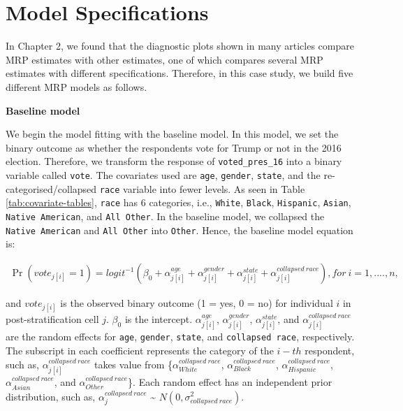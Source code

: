 \documentclass{monashthesis}
\begin{document}
\hypertarget{spec}{%
\section{Model Specifications}\label{spec}}

In Chapter 2, we found that the diagnostic plots shown in many articles compare MRP estimates with other estimates, one of which compares several MRP estimates with different specifications. Therefore, in this case study, we build five different MRP models as follows.

\newpage

\textbf{Baseline model}

We begin the model fitting with the baseline model. In this model, we set the binary outcome as whether the respondents vote for Trump or not in the 2016 election. Therefore, we transform the response of \texttt{voted\_pres\_16} into a binary variable called \texttt{vote}. The covariates used are \texttt{age}, \texttt{gender}, \texttt{state}, and the re-categorised/collapsed \texttt{race} variable into fewer levels. As seen in Table \ref{tab:covariate-tables}, \texttt{race} has 6 categories, i.e., \texttt{White}, \texttt{Black}, \texttt{Hispanic}, \texttt{Asian}, \texttt{Native\ American}, and \texttt{All\ Other}. In the baseline model, we collapsed the \texttt{Native\ American} and \texttt{All\ Other} into \texttt{Other}. Hence, the baseline model equation is:

\begin{equation} 
\begin{split}
\Pr(vote_{j[i]} = 1) = logit^{-1}\left(\beta_0 + \alpha^{age}_{j[i]} + \alpha^{gender}_{j[i]} + \alpha^{state}_{j[i]} + \alpha^{collapsed\ race}_{j[i]}\right), for\ i = 1, ...., n, 
\end{split}
\label{eq:baseline-model}
\end{equation}

and \(vote_{j[i]}\) is the observed binary outcome (1 = yes, 0 = no) for individual \(i\) in post-stratification cell \(j\). \(\beta_0\) is the intercept. \(\alpha^{age}_{j[i]}\), \(\alpha^{gender}_{j[i]}\), \(\alpha^{state}_{j[i]}\), and \(\alpha^{collapsed\ race}_{j[i]}\) are the random effects for \texttt{age}, \texttt{gender}, \texttt{state}, and \texttt{collapsed\ race}, respectively. The subscript in each coefficient represents the category of the \(i-th\) respondent, such as, \(\alpha^{collapsed\ race}_{j[i]}\) takes value from \{\(\alpha^{collapsed\ race}_{White}\), \(\alpha^{collapsed\ race}_{Black}\), \(\alpha^{collapsed\ race}_{Hispanic}\), \(\alpha^{collapsed\ race}_{Asian}\), and \(\alpha^{collapsed\ race}_{Other}\)\}. Each random effect has an independent prior distribution, such as, \(\alpha^{collapsed\ race}_{j}\) \textasciitilde{} \(N(0, \sigma^2_{collapsed\ race})\).
\end{document}
